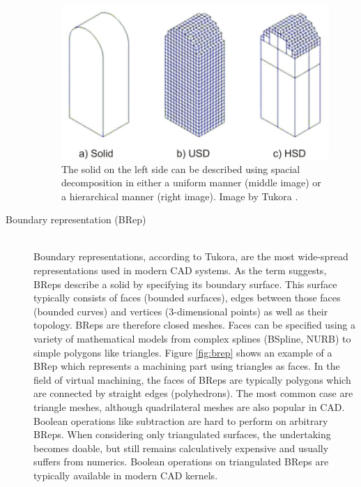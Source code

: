 \begin{description}
	\begin{figure}[h]
		\centering
		\includegraphics[width=\textwidth]{images/spacial_decomposition}
		\caption{
			The solid on the left side can be described using spacial decomposition in either a uniform manner (middle image) or a hierarchical manner (right image).
			Image by Tukora \cite{virtual_machining_review}. 
		}
		\label{fig:spacial_decomposition}
	\end{figure}
	

	\item[Boundary representation (BRep)] \hfill \\
	Boundary representations, according to Tukora, are the most wide-spread representations used in modern CAD systems.
	As the term suggests, BReps describe a solid by specifying its boundary surface.
	This surface typically consists of faces (bounded surfaces), edges between those faces (bounded curves) and vertices (3-dimensional points) as well as their topology.
	BReps are therefore closed meshes.
	Faces can be specified using a variety of mathematical models from complex splines (BSpline, NURB) to simple polygons like triangles.
	Figure \ref{fig:brep} shows an example of a BRep which represents a machining part using triangles as faces.
	In the field of virtual machining, the faces of BReps are typically polygons which are connected by straight edges (\ie polyhedrons).
	The most common case are triangle meshes, although quadrilateral meshes are also popular in CAD.
	Boolean operations like subtraction are hard to perform on arbitrary BReps.
	When considering only triangulated surfaces, the undertaking becomes doable, but still remains calculatively expensive and usually suffers from numerics.
	Boolean operations on triangulated BReps are typically available in modern CAD kernels.
	

\end{description}
